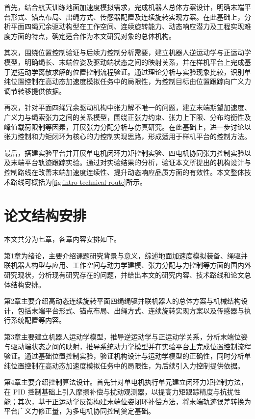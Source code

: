 首先，结合航天训练地面加速度模拟需求，完成机器人总体方案设计，明确末端平台形式、锚点布局、出绳方式、传感器配置及连续旋转实现方案。在此基础上，分析平面四绳冗余驱动构型在工作空间、连续旋转能力、动态响应潜力及工程实现难度方面的特点，确定适合作为本文研究对象的总体机构。

其次，围绕位置控制验证与后续力控制分析需要，建立机器人逆运动学与正运动学模型，明确绳长、末端位姿及驱动端状态之间的映射关系，并在样机平台上完成基于逆运动学离散求解的位置控制流程验证。通过理论分析与实验现象比较，识别单纯位置控制在高动态加速度模拟任务中的局限性，为控制目标由位置跟踪向广义力调节转移提供依据。

再次，针对平面四绳冗余驱动机构中张力解不唯一的问题，建立末端期望加速度、广义力与绳索张力之间的关系模型，围绕正张力约束、张力上下限、分布均衡性及峰值载荷限制等因素，开展张力分配分析与仿真研究。在此基础上，进一步讨论以张力控制和力矩闭环为核心的力控制实现思路，形成适用于样机平台的控制方法。

最后，搭建实验平台并开展单电机闭环力矩控制实验、四电机协同张力控制实验以及末端平台轨迹跟踪实验。通过对实验结果的分析，验证本文所提出的机构设计与控制路线在改善末端加速度连续性、提升动态响应品质方面的有效性。本文整体技术路线可概括为\cref{fig:intro-technical-route}所示。



\section{论文结构安排}

本文共分为七章，各章内容安排如下。

第1章为绪论，主要介绍课题研究背景与意义，综述地面加速度模拟装备、绳驱并联机器人构型与应用、工作空间与动力学建模、张力分配与力控制等方面的国内外研究现状，分析现有研究存在的问题，并给出本文的研究内容、技术路线和论文总体结构安排。

第2章主要介绍高动态连续旋转平面四绳绳驱并联机器人的总体方案与机械结构设计，包括末端平台形式、锚点布局、出绳方式、连续旋转实现方案以及传感器与执行系统配置等内容。

第3章主要建立机器人运动学模型，推导逆运动学与正运动学关系，分析末端位姿与驱动端状态之间的映射，推导系统动力学模型并在实验平台上完成位置控制流程验证。通过基础位置控制实验，验证机构设计与运动学模型的正确性，同时分析单纯位置控制在高动态加速度模拟任务中的局限性，为后续引入力控制提供依据。

第4章主要介绍控制算法设计。首先针对单电机执行单元建立闭环力矩控制方法，在 PID 控制基础上引入摩擦补偿与扰动观测器，以提高力矩跟踪精度与抗扰性能；其次，基于正运动学反馈构建末端位姿闭环补偿方法，将末端轨迹误差转换为平台广义力修正量，为多电机协同控制奠定基础。

